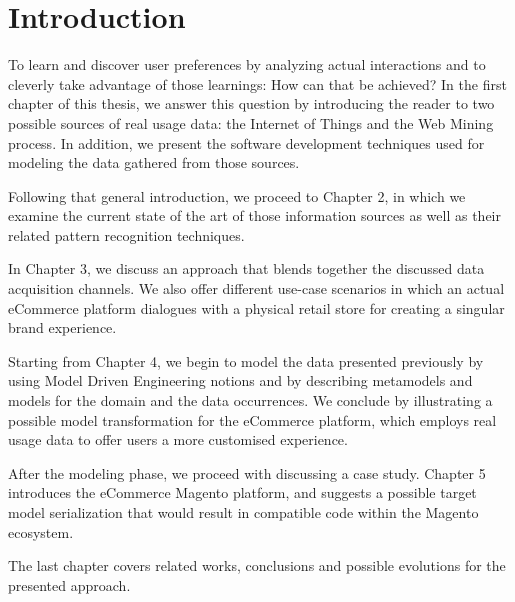 
\chapter*{Introduction}

To learn and discover user preferences by analyzing actual interactions and to cleverly take advantage of those learnings: How can that be achieved? In the first chapter of this thesis, we answer this question by introducing the reader to two possible sources of real usage data: the Internet of Things and the Web Mining process. In addition, we present the software development techniques used for modeling the data gathered from those sources.

Following that general introduction, we proceed to Chapter 2, in which we examine the current state of the art of those information sources as well as their related pattern recognition techniques.

In Chapter 3, we discuss an approach that blends together the discussed data acquisition channels. We also offer different use-case scenarios in which an actual eCommerce platform dialogues with a physical retail store for creating a singular brand experience.

Starting from Chapter 4, we begin to model the data presented previously by using Model Driven Engineering notions and by describing metamodels and models for the domain and the data occurrences. We conclude by illustrating a possible model transformation for the eCommerce platform, which employs real usage data to offer users a more customised experience.

After the modeling phase, we proceed with discussing a case study. Chapter 5 introduces the eCommerce Magento platform, and suggests a possible target model serialization that would result in compatible code within the Magento ecosystem.

The last chapter covers related works, conclusions and possible evolutions for the presented approach.

